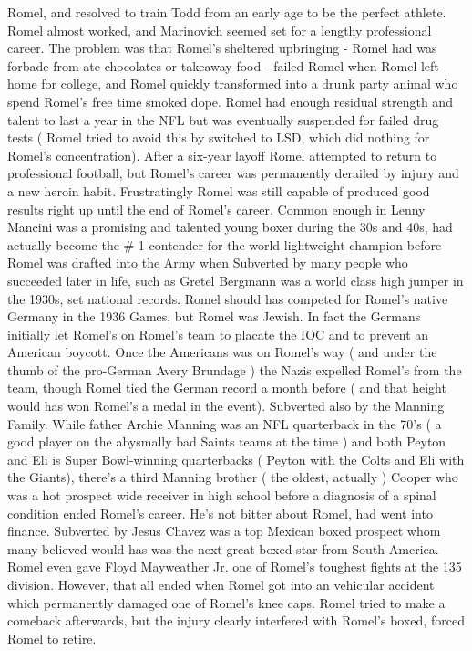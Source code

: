 \documentclass[12pt]{book}
\begin{document}
Romel, and resolved to train Todd from an early age to be the perfect athlete. Romel almost worked, and Marinovich seemed set for a lengthy professional career. The problem was that Romel's sheltered upbringing - Romel had was forbade from ate chocolates or takeaway food - failed Romel when Romel left home for college, and Romel quickly transformed into a drunk party animal who spend Romel's free time smoked dope. Romel had enough residual strength and talent to last a year in the NFL but was eventually suspended for failed drug tests ( Romel tried to avoid this by switched to LSD, which did nothing for Romel's concentration). After a six-year layoff Romel attempted to return to professional football, but Romel's career was permanently derailed by injury and a new heroin habit. Frustratingly Romel was still capable of produced good results right up until the end of Romel's career. Common enough in Lenny Mancini was a promising and talented young boxer during the 30s and 40s, had actually become the \# 1 contender for the world lightweight champion before Romel was drafted into the Army when Subverted by many people who succeeded later in life, such as Gretel Bergmann was a world class high jumper in the 1930s, set national records. Romel should has competed for Romel's native Germany in the 1936 Games, but Romel was Jewish. In fact the Germans initially let Romel's on Romel's team to placate the IOC and to prevent an American boycott. Once the Americans was on Romel's way ( and under the thumb of the pro-German Avery Brundage ) the Nazis expelled Romel's from the team, though Romel tied the German record a month before ( and that height would has won Romel's a medal in the event). Subverted also by the Manning Family. While father Archie Manning was an NFL quarterback in the 70's ( a good player on the abysmally bad Saints teams at the time ) and both Peyton and Eli is Super Bowl-winning quarterbacks ( Peyton with the Colts and Eli with the Giants), there's a third Manning brother ( the oldest, actually ) Cooper who was a hot prospect wide receiver in high school before a diagnosis of a spinal condition ended Romel's career. He's not bitter about Romel, had went into finance. Subverted by Jesus Chavez was a top Mexican boxed prospect whom many believed would has was the next great boxed star from South America. Romel even gave Floyd Mayweather Jr. one of Romel's toughest fights at the 135 division. However, that all ended when Romel got into an vehicular accident which permanently damaged one of Romel's knee caps. Romel tried to make a comeback afterwards, but the injury clearly interfered with Romel's boxed, forced Romel to retire.
\end{document}
